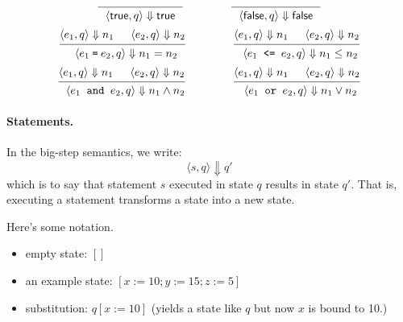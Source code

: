 \documentclass[11pt]{article}
\begin{document}
\[
  \begin{prooftree}
  \infer0{~~\langle \mathsf{true}, q \rangle \Downarrow \mathsf{true}~~}
  \end{prooftree} \hspace*{4em} \
  \begin{prooftree}
  \infer0{~~\langle \mathsf{false}, q \rangle \Downarrow \mathsf{false}~~}
  \end{prooftree}
\]
\[
  \begin{prooftree}
    \hypo{\langle e_1, q \rangle \Downarrow n_1}
    \hypo{\langle e_2, q \rangle \Downarrow n_2}
  \infer2{~~\langle e_1 \texttt{\:=\:} e_2, q \rangle \Downarrow n_1 = n_2}
  \end{prooftree}  \hspace*{4em} \
  \begin{prooftree}
    \hypo{\langle e_1, q \rangle \Downarrow n_1}
    \hypo{\langle e_2, q \rangle \Downarrow n_2}
  \infer2{~~\langle e_1 \texttt{~<=~} e_2, q \rangle \Downarrow n_1 \leq n_2}
  \end{prooftree}
\]
\[
  \begin{prooftree}
    \hypo{\langle e_1, q \rangle \Downarrow n_1}
    \hypo{\langle e_2, q \rangle \Downarrow n_2}
  \infer2{~~\langle e_1 \texttt{~and~} e_2, q \rangle \Downarrow n_1 \wedge n_2}
  \end{prooftree}  \hspace*{4em} \
  \begin{prooftree}
    \hypo{\langle e_1, q \rangle \Downarrow n_1}
    \hypo{\langle e_2, q \rangle \Downarrow n_2}
  \infer2{~~\langle e_1 \texttt{~or~} e_2, q \rangle \Downarrow n_1 \vee n_2}
  \end{prooftree}
  \]

  \paragraph{Statements.} In the big-step semantics, we write:
  \[ \langle s, q \rangle \Downarrow q' \]
  which is to say that statement $s$ executed in state $q$ results in state $q'$. That is, executing a statement transforms a state into a new state.

  Here's some notation.
  \begin{itemize}[noitemsep]
  \item empty state: $[]$
  \item an example state: $[x := 10; y := 15; z := 5]$
  \item substitution: $q[x := 10]$ (yields a state like $q$ but now $x$ is bound to 10.)
  \end{itemize}
\end{document}
